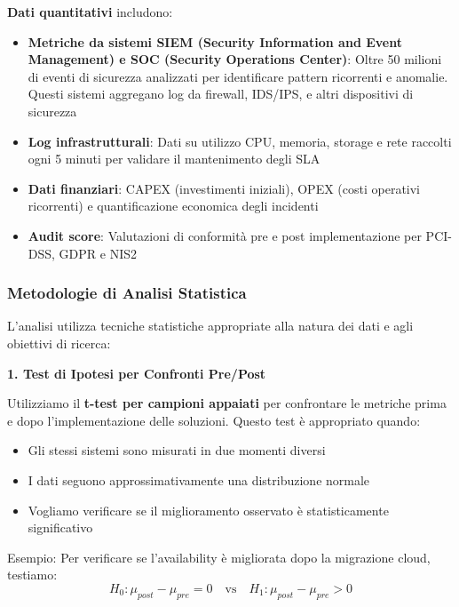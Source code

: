\textbf{Dati quantitativi} includono:
\begin{itemize}
    \item \textbf{Metriche da sistemi SIEM (Security Information and Event Management) e SOC (Security Operations Center)}: Oltre 50 milioni di eventi di sicurezza analizzati per identificare pattern ricorrenti e anomalie. Questi sistemi aggregano log da firewall, IDS/IPS, e altri dispositivi di sicurezza
    \item \textbf{Log infrastrutturali}: Dati su utilizzo CPU, memoria, storage e rete raccolti ogni 5 minuti per validare il mantenimento degli SLA
    \item \textbf{Dati finanziari}: CAPEX (investimenti iniziali), OPEX (costi operativi ricorrenti) e quantificazione economica degli incidenti
    \item \textbf{Audit score}: Valutazioni di conformità pre e post implementazione per PCI-DSS, GDPR e NIS2
\end{itemize}

\subsubsection{\texorpdfstring{\textbf{Metodologie di Analisi Statistica}}{1.5.3.2 Metodologie di Analisi Statistica}}\label{metodologia-statistica}

L'analisi utilizza tecniche statistiche appropriate alla natura dei dati e agli obiettivi di ricerca:

\textbf{1. Test di Ipotesi per Confronti Pre/Post}

Utilizziamo il \textbf{t-test per campioni appaiati} per confrontare le metriche prima e dopo l'implementazione delle soluzioni. Questo test è appropriato quando:
\begin{itemize}
    \item Gli stessi sistemi sono misurati in due momenti diversi
    \item I dati seguono approssimativamente una distribuzione normale
    \item Vogliamo verificare se il miglioramento osservato è statisticamente significativo
\end{itemize}

\noindent Esempio: Per verificare se l'availability è migliorata dopo la migrazione cloud, testiamo:
\begin{equation}
H_0: \mu_{post} - \mu_{pre} = 0 \quad \text{vs} \quad H_1: \mu_{post} - \mu_{pre} > 0
\end{equation}

